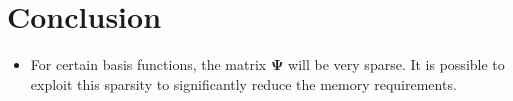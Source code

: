 \chapter{Conclusion}

\begin{itemize}
\item For certain basis functions, the matrix $\bm\Psi$ will be very sparse. It is possible to exploit this sparsity to significantly reduce the memory requirements. 
\end{itemize}
